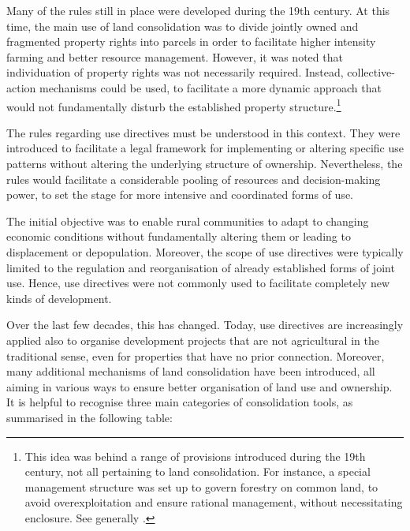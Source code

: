 Many of the rules still in place were developed during the 19th century. At this time, the main use of land consolidation was to divide jointly owned and fragmented property rights into parcels in order to facilitate higher intensity farming and better resource management.  However, it was noted that individuation of property rights was not necessarily required. Instead, collective-action mechanisms could be used, to facilitate a more dynamic approach that would not fundamentally disturb the established property structure.\footnote{This idea was behind a range of provisions introduced during the 19th century, not all pertaining to land consolidation. For instance, a special management structure was set up to govern forestry on common land, to avoid overexploitation and ensure rational management, without necessitating enclosure. See generally \cite{stenseth10a}.}

The rules regarding use directives must be understood in this context. They were introduced to facilitate a legal framework for implementing or altering specific use patterns without altering the underlying structure of ownership. Nevertheless, the rules would facilitate a considerable pooling of resources and decision-making power, to set the stage for more intensive and coordinated forms of use.

The initial objective was to enable rural communities to adapt to changing economic conditions without fundamentally altering them or leading to displacement or depopulation. Moreover, the scope of use directives were typically limited to the regulation and reorganisation of already established forms of joint use. Hence, use directives were not commonly used to facilitate completely new kinds of development.

Over the last few decades, this has changed. Today, use directives are increasingly applied also to organise development projects that are not agricultural in the traditional sense, even for properties that have no prior connection. Moreover, many additional mechanisms of land consolidation have been introduced, all aiming in various ways to ensure better organisation of land use and ownership. It is helpful to recognise three main categories of consolidation tools, as summarised in the following table:

